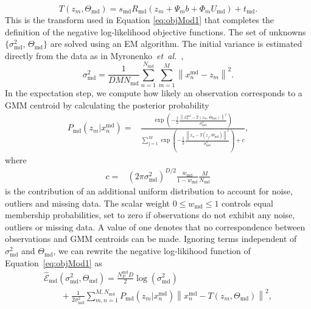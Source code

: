 \documentclass[journal]{IEEEtran}
\begin{document}
\begin{equation} \label{eq:concTransform2}
T(z_m,\Theta_\mathrm{md}) = s_\mathrm{md}R_\mathrm{md}(z_m+\Psi_mb+\Phi_mU_\mathrm{md})+t_\mathrm{md}.
\end{equation}
This is the transform used in Equation \eqref{eq:objMod1} that completes the definition of the negative log-likelihood objective functions.  The set of unknowns $\{\sigma^2_\mathrm{md}$, $\Theta_\mathrm{md}\}$ are solved using an EM algorithm. The initial variance is estimated directly from the data as in Myronenko~\textit{et~al.}~\cite{Myronenko10a},
\begin{equation} \label{eq:initVariance}
\sigma^2_\mathrm{md} = \frac{1}{DMN_\mathrm{md}}\sum_{n=1}^{N_\mathrm{md}}\sum_{m=1}^{M}\left\|x^{\mathrm{md}}_n-z_m\right\|^2.
\end{equation}
In the expectation step, we compute how likely an observation corresponds to a GMM centroid by calculating the posterior probability
\begin{align} \label{eq:prob}
P_\mathrm{md}(z_m|x^\mathrm{md}_n) = & \frac{\exp{\left(-\frac{1}{2}\frac{\left\|x^\mathrm{md}_n -T(z_m,\Theta_\mathrm{md})\right\|^2}{\sigma^2_\mathrm{md}}\right)}}{\sum_{j=1}^M\exp{\left(-\frac{1}{2}\frac{\left\|x_n -T(z_j,\Theta_\mathrm{md})\right\|^2}{\sigma^2_\mathrm{md}}\right)} + c},
\end{align}
where 
\begin{align}
c = & \left(2\pi\sigma^2_\mathrm{md}\right)^{D/2}\frac{w_\mathrm{md}}{1-w_\mathrm{md}}\frac{M}{N_\mathrm{md}}
\end{align}
is the contribution of an additional uniform distribution to account for noise, outliers and missing data. The scalar weight $0{\leq}w_\mathrm{md}{\leq}1$ controls equal membership probabilities, set to zero if observations do not exhibit any noise, outliers or missing data. A value of one denotes that no correspondence between observations and GMM centroids can be made. Ignoring terms independent of $\sigma^2_\mathrm{md}$ and $\Theta_\mathrm{md}$, we can rewrite the negative log-likihood function of Equation~\eqref{eq:objMod1} as
\begin{multline} 
\hat{\mathcal{E}}_\mathrm{md}(\sigma^2_\mathrm{md},\Theta_\mathrm{md}) = \frac{N^\mathrm{md}_PD}{2}\log(\sigma^2_\mathrm{md})\\
\quad\quad + \frac{1}{2\sigma^2_\mathrm{md}}\sum_{m,n=1}^{M,N_\mathrm{md}}P_\mathrm{md}(z_m|x^\mathrm{md}_n)\left\|x^\mathrm{md}_n- T(z_m,\Theta_\mathrm{md})\right\|^2, \label{eq:Emd}
\end{multline}
\end{document}
